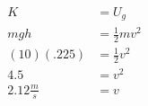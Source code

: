 \documentclass[12pt]{article}
\begin{document}














\begin{align} %
K &= U_g \\
mgh &=\frac{1}{2}mv^2 \\
(10)(.225) &=\frac{1}{2}v^2 \nonumber \\  %
4.5 &=v^2 \nonumber \\
2.12 \frac{m}{s} &=v 
\end{align}
\end{document}

